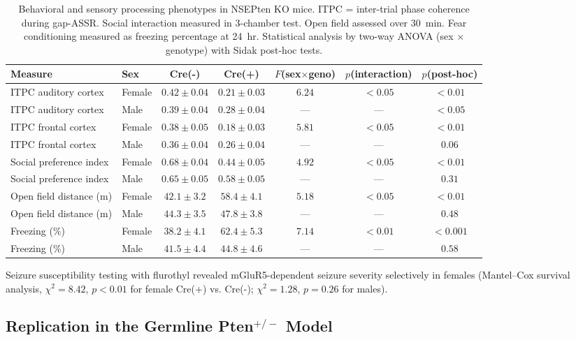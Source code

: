 \documentclass[11pt]{article}
\begin{document}
\begin{table}[H]
\centering
\caption{Behavioral and sensory processing phenotypes in NSEPten KO mice. ITPC = inter-trial phase coherence during gap-ASSR. Social interaction measured in 3-chamber test. Open field assessed over 30~min. Fear conditioning measured as freezing percentage at 24~hr. Statistical analysis by two-way ANOVA (sex $\times$ genotype) with Sidak post-hoc tests.}
\label{tab:behavior}
\begin{tabular}{llccccc}
\toprule
\textbf{Measure} & \textbf{Sex} & \textbf{Cre(-)} & \textbf{Cre(+)} & \textbf{$F$(sex$\times$geno)} & \textbf{$p$(interaction)} & \textbf{$p$(post-hoc)} \\
\midrule
ITPC auditory cortex & Female & $0.42 \pm 0.04$ & $0.21 \pm 0.03$ & $6.24$ & $< 0.05$ & $< 0.01$ \\
ITPC auditory cortex & Male & $0.39 \pm 0.04$ & $0.28 \pm 0.04$ & --- & --- & $< 0.05$ \\
ITPC frontal cortex & Female & $0.38 \pm 0.05$ & $0.18 \pm 0.03$ & $5.81$ & $< 0.05$ & $< 0.01$ \\
ITPC frontal cortex & Male & $0.36 \pm 0.04$ & $0.26 \pm 0.04$ & --- & --- & $0.06$ \\
Social preference index & Female & $0.68 \pm 0.04$ & $0.44 \pm 0.05$ & $4.92$ & $< 0.05$ & $< 0.01$ \\
Social preference index & Male & $0.65 \pm 0.05$ & $0.58 \pm 0.05$ & --- & --- & $0.31$ \\
Open field distance (m) & Female & $42.1 \pm 3.2$ & $58.4 \pm 4.1$ & $5.18$ & $< 0.05$ & $< 0.01$ \\
Open field distance (m) & Male & $44.3 \pm 3.5$ & $47.8 \pm 3.8$ & --- & --- & $0.48$ \\
Freezing (\%) & Female & $38.2 \pm 4.1$ & $62.4 \pm 5.3$ & $7.14$ & $< 0.01$ & $< 0.001$ \\
Freezing (\%) & Male & $41.5 \pm 4.4$ & $44.8 \pm 4.6$ & --- & --- & $0.58$ \\
\bottomrule
\end{tabular}
\end{table}

Seizure susceptibility testing with flurothyl revealed mGluR5-dependent seizure severity selectively in females (Mantel--Cox survival analysis, $\chi^2 = 8.42$, $p < 0.01$ for female Cre(+) vs. Cre(-); $\chi^2 = 1.28$, $p = 0.26$ for males).

\subsection{Replication in the Germline Pten$^{+/-}$ Model}
\end{document}
